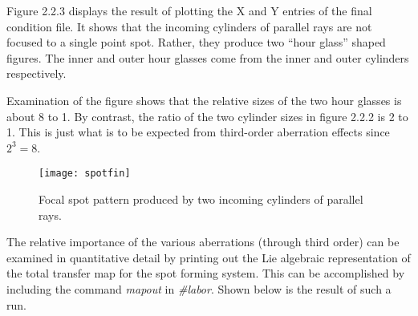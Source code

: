Figure 2.2.3 displays the result of plotting the X and Y entries of the
final condition file.  It shows that the incoming cylinders of parallel
rays are not focused to a single point spot.  Rather, they produce two
``hour glass'' shaped figures.  The inner and outer hour glasses come from
the inner and outer cylinders respectively.

     Examination of the figure shows that the relative sizes of the two
hour glasses is about 8 to 1.  By contrast, the ratio of the two cylinder
sizes in figure 2.2.2 is 2 to 1.  This is just what is to be expected from
third-order aberration effects since $2^3=8$.

\begin{figure}[hbp]
  \centering
  \texttt{[image: spotfin]}
  \caption{Focal spot pattern produced by two incoming cylinders of parallel rays.}
\end{figure}

     The relative importance of the various aberrations (through third
order) can be examined in quantitative detail by printing out the Lie
algebraic representation of the total transfer map for the spot forming
system.  This can be accomplished by including the command {\em mapout} in
{\em \#labor}.  Shown below is the result of such a  run.
\pagebreak

